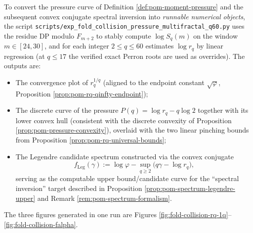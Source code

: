 \begin{remark}\label{rem:pom-pressure-multifractal-q60}
To convert the pressure curve of Definition \ref{def:pom-moment-pressure} and the subsequent convex conjugate spectral inversion into \emph{runnable numerical objects},
the script \texttt{scripts/exp\_fold\_collision\_pressure\_multifractal\_q60.py} uses the residue DP modulo \(F_{m+2}\) to stably compute \(\log S_q(m)\) on the window \(m\in[24,30]\), and for each integer \(2\le q\le 60\) estimates \(\log r_q\) by linear regression (at \(q\le 17\) the verified exact Perron roots are used as overrides).
The outputs are:
\begin{itemize}
  \item The convergence plot of \(r_q^{1/q}\) (aligned to the endpoint constant \(\sqrt{\varphi}\), Proposition \ref{prop:pom-rq-qinfty-endpoint});
  \item The discrete curve of the pressure \(P(q)=\log r_q-q\log 2\) together with its lower convex hull (consistent with the discrete convexity of Proposition \ref{prop:pom-pressure-convexity}), overlaid with the two linear pinching bounds from Proposition \ref{prop:pom-rq-universal-bounds};
  \item The Legendre candidate spectrum constructed via the convex conjugate
  \[
  f_{\mathrm{Leg}}(\gamma):=\log\varphi-\sup_{q\ge 2}\bigl(q\gamma-\log r_q\bigr),
  \]
  serving as the computable upper bound/candidate curve for the ``spectral inversion'' target described in Proposition \ref{prop:pom-spectrum-legendre-upper} and Remark \ref{rem:pom-spectrum-formalism}.
\end{itemize}
The three figures generated in one run are Figures \ref{fig:fold-collision-rq-1q}--\ref{fig:fold-collision-falpha}.



\end{remark}


